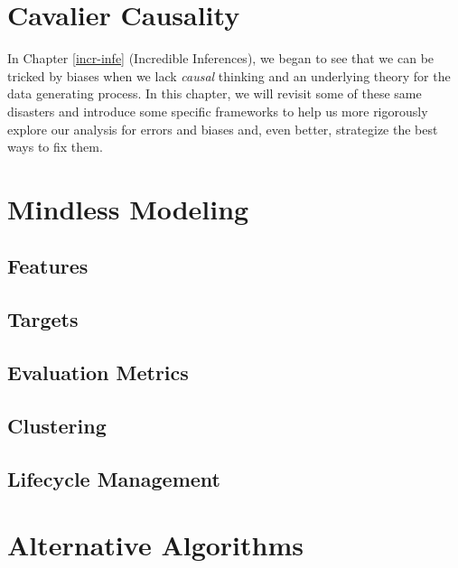 \documentclass[
]{krantz}
\begin{document}
\hypertarget{cava-caus}{%
\chapter{Cavalier Causality}\label{cava-caus}}

In Chapter \ref{incr-infe} (Incredible Inferences), we began to see that we can be tricked by biases when we lack \emph{causal} thinking and an underlying theory for the data generating process. In this chapter, we will revisit some of these same disasters and introduce some specific frameworks to help us more rigorously explore our analysis for errors and biases and, even better, strategize the best ways to fix them.

\hypertarget{mind-mod}{%
\chapter{Mindless Modeling}\label{mind-mod}}

\hypertarget{features}{%
\section{Features}\label{features}}

\hypertarget{targets}{%
\section{Targets}\label{targets}}

\hypertarget{evaluation-metrics}{%
\section{Evaluation Metrics}\label{evaluation-metrics}}

\hypertarget{clustering}{%
\section{Clustering}\label{clustering}}

\hypertarget{lifecycle-management}{%
\section{Lifecycle Management}\label{lifecycle-management}}

\hypertarget{alt-alg}{%
\chapter{Alternative Algorithms}\label{alt-alg}}
\end{document}
